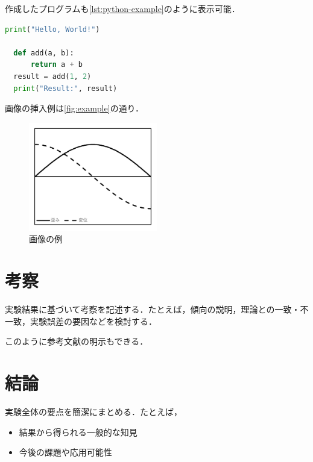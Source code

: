 \documentclass[lualatex,ja=standard]{bxjsarticle}
\begin{document}
作成したプログラムも\autoref{lst:python-example}のように表示可能．

\begin{lstlisting}[language=Python, caption=Pythonの例, label=lst:python-example]
  print("Hello, World!")

  def add(a, b):
      return a + b
  result = add(1, 2)
  print("Result:", result)
\end{lstlisting}

画像の挿入例は\autoref{fig:example}の通り．

\begin{figure}[htbp]
  \centering
  \includegraphics[width=0.5\textwidth]{img/CN/graph.png}
  \caption{画像の例}
  \label{fig:example}
\end{figure}

\section{考察}
実験結果に基づいて考察を記述する．たとえば，傾向の説明，理論との一致・不一致，実験誤差の要因などを検討する．

このように参考文献の明示もできる\cite{nist811-si-guide}．

\section{結論}
実験全体の要点を簡潔にまとめる．たとえば，
\begin{itemize}
  \item 結果から得られる一般的な知見
  \item 今後の課題や応用可能性
\end{itemize}

\printbibliography[title=＜参考文献＞]
\end{document}
